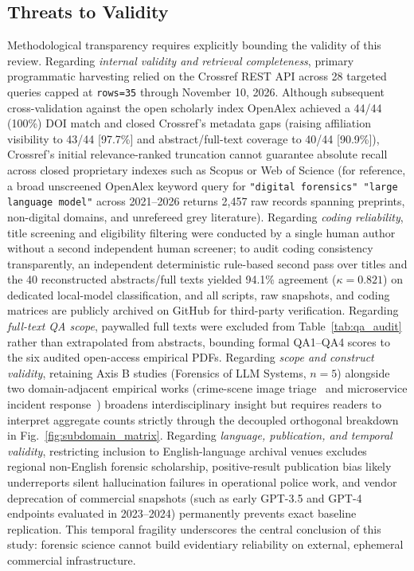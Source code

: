 \subsection{Threats to Validity}
Methodological transparency requires explicitly bounding the validity of this review. Regarding \textit{internal validity and retrieval completeness}, primary programmatic harvesting relied on the Crossref REST API across 28 targeted queries capped at \texttt{rows=35} through November 10, 2026. Although subsequent cross-validation against the open scholarly index OpenAlex achieved a 44/44 (100\%) DOI match and closed Crossref's metadata gaps (raising affiliation visibility to 43/44 [97.7\%] and abstract/full-text coverage to 40/44 [90.9\%]), Crossref's initial relevance-ranked truncation cannot guarantee absolute recall across closed proprietary indexes such as Scopus or Web of Science (for reference, a broad unscreened OpenAlex keyword query for \texttt{"digital forensics" "large language model"} across 2021--2026 returns 2,457 raw records spanning preprints, non-digital domains, and unrefereed grey literature). Regarding \textit{coding reliability}, title screening and eligibility filtering were conducted by a single human author without a second independent human screener; to audit coding consistency transparently, an independent deterministic rule-based second pass over titles and the 40 reconstructed abstracts/full texts yielded 94.1\% agreement ($\kappa=0.821$) on dedicated local-model classification, and all scripts, raw snapshots, and coding matrices are publicly archived on GitHub for third-party verification. Regarding \textit{full-text QA scope}, paywalled full texts were excluded from Table~\ref{tab:qa_audit} rather than extrapolated from abstracts, bounding formal QA1--QA4 scores to the six audited open-access empirical PDFs. Regarding \textit{scope and construct validity}, retaining Axis B studies (Forensics of LLM Systems, $n=5$) alongside two domain-adjacent empirical works (crime-scene image triage~\cite{farber2025_scpaiscp} and microservice incident response~\cite{tian2026_gala}) broadens interdisciplinary insight but requires readers to interpret aggregate counts strictly through the decoupled orthogonal breakdown in Fig.~\ref{fig:subdomain_matrix}. Regarding \textit{language, publication, and temporal validity}, restricting inclusion to English-language archival venues excludes regional non-English forensic scholarship, positive-result publication bias likely underreports silent hallucination failures in operational police work, and vendor deprecation of commercial snapshots (such as early GPT-3.5 and GPT-4 endpoints evaluated in 2023--2024) permanently prevents exact baseline replication. This temporal fragility underscores the central conclusion of this study: forensic science cannot build evidentiary reliability on external, ephemeral commercial infrastructure.
